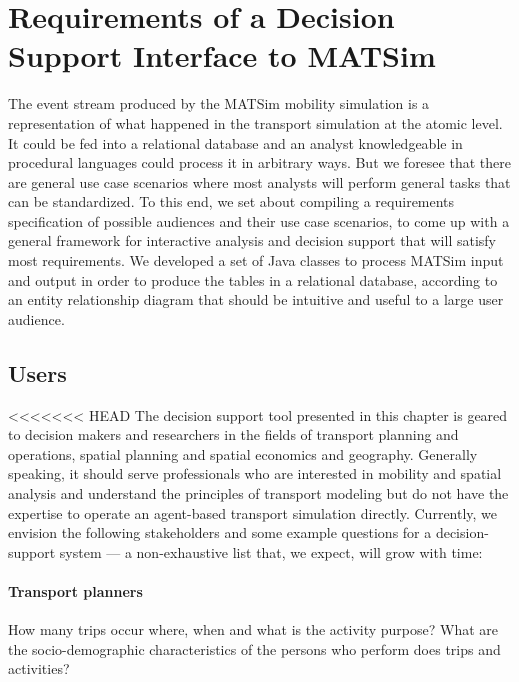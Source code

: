 \section{Requirements of a Decision Support Interface to MATSim}
\label{sec:analyticsRequirements}
The event stream produced by the MATSim mobility simulation is a representation of what happened in the transport simulation at the atomic level. It could be fed into a relational database and an analyst knowledgeable in procedural languages could process it in arbitrary ways. But we foresee that there are general use case scenarios where most analysts will perform general tasks that can be standardized. To this end, we set about compiling a requirements specification of possible audiences and their use case scenarios, to come up with a general framework for interactive analysis and decision support that will satisfy most requirements. We developed a set of Java classes to process MATSim input and output in order to produce the tables in a relational database, according to an entity relationship diagram that should be intuitive and useful to a large user audience.

\subsection{Users}
<<<<<<< HEAD
The decision support tool presented in this chapter is geared to decision makers and researchers in the fields of transport planning and operations, spatial planning and spatial economics and geography. Generally speaking, it should serve professionals who are interested in mobility and spatial analysis and understand the principles of transport modeling but do not have the expertise to operate an agent-based transport simulation directly. Currently, we envision the following stakeholders and some example questions for a decision-support system --- a non-exhaustive list that, we expect, will grow with time:
\paragraph{Transport planners}
How many trips occur where, when and what is the activity purpose?
What are the socio-demographic characteristics of the persons who perform does trips and activities?
